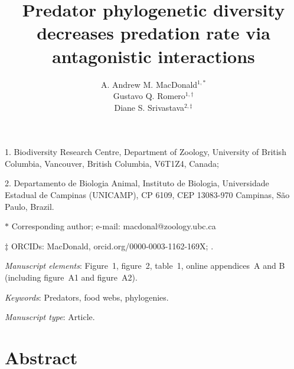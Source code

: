 \documentclass[11pt]{article}
\title{Predator phylogenetic diversity decreases predation rate via antagonistic interactions}
\author{A. Andrew M. MacDonald$^{1,\ast}$ \\ 
Gustavo Q. Romero$^{1,\dag}$ \\ 
Diane S. Srivastava$^{2,\ddag}$}
\date{}
\begin{document}
\maketitle

\noindent{}1. Biodiversity Research Centre, Department of Zoology, University of British Columbia, Vancouver, British Columbia, V6T1Z4, Canada;

\noindent{}2. Departamento de Biologia Animal, Instituto de Biologia, Universidade Estadual de Campinas (UNICAMP), CP 6109, CEP 13083-970 Campinas, S\~{a}o Paulo, Brazil.

\noindent{}$\ast$ Corresponding author; e-mail: macdonal@zoology.ubc.ca

\noindent{}$\ddag$ ORCIDs: MacDonald, orcid.org/0000-0003-1162-169X; .

\bigskip

\textit{Manuscript elements}: Figure~1, figure~2, table~1, online
appendices~A and B (including figure~A1 and figure~A2). %

\bigskip

\textit{Keywords}: Predators, food webs, phylogenies.

\bigskip

\textit{Manuscript type}: Article. 

\bigskip


\linenumbers{}
\modulolinenumbers[3]

\newpage{}

\section*{Abstract}
\end{document}
